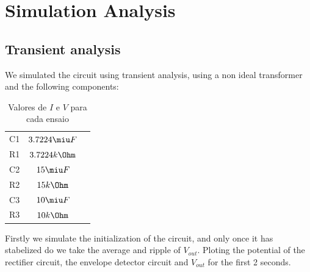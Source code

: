 \section{Simulation Analysis}
\label{sec:simulation}

\subsection{Transient analysis}

We simulated the circuit using transient analysis, using a non ideal transformer and the following components:

\begin{table}[H]
\addtolength{\tabcolsep}{-4pt}
\caption{Valores de $I$ e $V$ para cada ensaio}
\vspace{-3mm}
\begin{tabular}{|c|c|c|}
\hline
C1 & $3.7224\miu F$ \\
R1 & $3.7224k\Ohm$ \\
C2 & $15\miu F$ \\
R2 & $15k\Ohm$ \\
C3 & $10\miu F$ \\
R3 & $10k\Ohm$ \\
\hline
\end{tabular}
\label{tab:Components}
\end{table}

\par

Firstly we simulate the initialization of the circuit, and only once it has stabelized do we take the average and ripple of $V_{out}$. Ploting the potential of the rectifier circuit, the envelope detector circuit and $V_{out}$ for the first 2 seconds.

